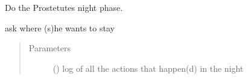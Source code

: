 \documentclass[letterpaper,10pt,english]{sphinxmanual}
\begin{document}
\begin{fulllineitems}
\begin{fulllineitems}
\begin{quote}
\begin{description}
\end{description}\end{quote}

\end{fulllineitems}



\begin{fulllineitems}
\end{fulllineitems}



\begin{fulllineitems}
Do the Prostetutes night phase.

ask where (s)he wants to stay
\begin{quote}\begin{description}
\item[{Parameters}] \leavevmode
{} ({\hyperref[\detokenize{chatwolf:chatwolf.nightactions.Nightactions}]{}}) \textendash{} log of all the actions that happen(d) in the night

\end{description}\end{quote}

\end{fulllineitems}


\end{fulllineitems}
\end{document}
